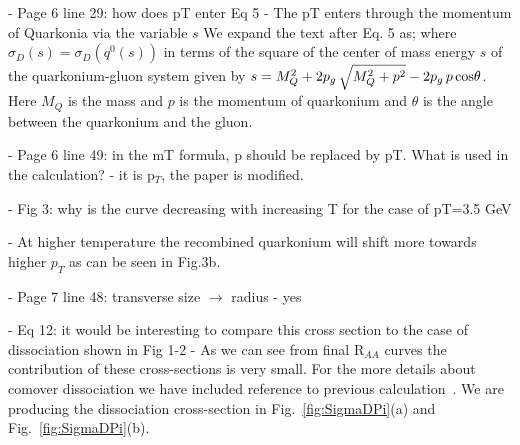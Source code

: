 \documentclass[a4paper,11pt]{article}
\begin{document}
- Page 6 line 29: how does pT enter Eq 5 \newline
- {\color{blue} The pT enters through the momentum of Quarkonia via the variable $s$
  We expand the text after Eq. 5 as;
  where $\sigma_{D}(s) = \sigma_{D}(q^0(s))$ in terms of the square of the center of
  mass energy $s$ of the quarkonium-gluon system given by
  $s=M_{Q}^{2} + 2  p_g \, \sqrt{M_{Q}^2 + p^2} - 2  p_g \, p \, {\rm cos\theta}$.
  Here $M_{Q}$ is the mass and $p$ is the momentum of quarkonium and $\theta$ is the angle
  between the quarkonium and the gluon.
}




- Page 6 line 49: in the mT formula, p should be replaced by pT. What is used in the calculation? \newline
- {\color{blue} it is p$_{T}$, the paper is modified.}\newline

- Fig 3: why is the curve decreasing with increasing T for the case of pT=3.5 GeV \newline

- {\color{blue} At higher temperature the recombined quarkonium will shift more towards higher
  $p_T$ as can be seen in Fig.3b.
}\newline




- Page 7 line 48: transverse size $\rightarrow$ radius \newline
- {\color{blue} yes}\newline

- Eq 12: it would be interesting to compare this cross section to the case of dissociation shown in Fig 1-2 \newline
- {\color{blue} As we can see from final R$_{AA}$ curves the contribution of these cross-sections is very small.
  For the more details about comover dissociation we have included reference to previous calculation~\cite{Kumar:2014kfa}.
  We are producing the dissociation cross-section in Fig.~\ref{fig:SigmaDPi}(a) and Fig.~\ref{fig:SigmaDPi}(b).
}\newline
\end{document}
